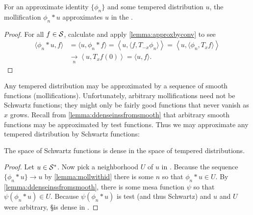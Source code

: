     \begin{lemma}
      \label{lemma:mollwithid}
      For an approximate identity $\{\phi_n\}$ and some tempered distribution $u$, the mollification $\phi_n*u$ approximates $u$ in the \ws.
    \end{lemma}
    \begin{proof}
      For all $f\in\S$, calculate and apply \cref{lemma:approxbyconv} to see
      \begin{align*}
        \langle \phi_n*u, f\rangle
        &= \langle u, \phi_n*f\rangle
        = \left\langle u, \langle f, T_{-x}\phi_n\rangle \right\rangle
        = \left\langle u, \langle \phi_n, T_{x}f\rangle \right\rangle
        \\&\underset{n}{\longrightarrow} \left\langle u, T_xf(0) \right\rangle
        = \langle u,f\rangle \text{.}
      \end{align*}
    \end{proof}

    Any tempered distribution may be approximated by a sequence of smooth functions (mollifications).
    Unfortunately, arbitrary mollifications need not be Schwartz functions; they might only be fairly good functions that never vanish as $x$ grows.
    Recall from \cref{lemma:ddenseinssfromsmooth} that arbitrary smooth functions may be approximated by test functions.
    Thus we may approximate any tempered distribution by Schwartz functions:

    \begin{thm}
      \label{thm:sdenseinss}
      The space of Schwartz functions is dense in the space of tempered distributions.
    \end{thm}
    \begin{proof}
      Let $u\in\SS$.
      Now pick a neighborhood $U$ of $u$ in \SS.
      Because the sequence $\{\phi_n*u\}\rightarrow u$ by \cref{lemma:mollwithid} there is some $n$ so that $\phi_n*u\in U$.
      By \cref{lemma:ddenseinssfromsmooth}, there is some mesa function $\psi$ so that $\psi(\phi_n*u)\in U$.
      Because $\psi(\phi_n*u)$ is test (and thus Schwartz) and $u$ and $U$ were arbitrary, \S is dense in \SS.
    \end{proof}


